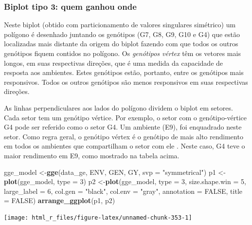 \documentclass[
]{book}
\newenvironment{Shaded}{\begin{snugshade}}{\end{snugshade}}
\newcommand{\DataTypeTok}[1]{\textcolor[rgb]{0.13,0.29,0.53}{#1}}
\newcommand{\DecValTok}[1]{\textcolor[rgb]{0.00,0.00,0.81}{#1}}
\newcommand{\KeywordTok}[1]{\textcolor[rgb]{0.13,0.29,0.53}{\textbf{#1}}}
\newcommand{\NormalTok}[1]{#1}
\newcommand{\OtherTok}[1]{\textcolor[rgb]{0.56,0.35,0.01}{#1}}
\newcommand{\StringTok}[1]{\textcolor[rgb]{0.31,0.60,0.02}{#1}}
\begin{document}
\hypertarget{biplot-tipo-3-quem-ganhou-onde}{%
\subsubsection{Biplot tipo 3: quem ganhou onde}\label{biplot-tipo-3-quem-ganhou-onde}}

Neste biplot (obtido com particionamento de valores singulares simétrico) um polígono é desenhado juntando os genótipos (G7, G8, G9, G10 e G4) que estão localizadas mais distante da origem do biplot fazendo com que todos os outros genótipos fiquem contidos no polígono. Os \emph{genótipos vértex} têm os vetores mais longos, em suas respectivas direções, que é uma medida da capacidade de resposta aos ambientes. Estes genótipos estão, portanto, entre os genótipos mais responsivos. Todos os outros genótipos são menos responsivos em suas respectivas direções.

As linhas perpendiculares aos lados do polígono dividem o biplot em setores. Cada setor tem um genótipo vértice. Por exemplo, o setor com o genótipo-vértice G4 pode ser referido como o setor G4. Um ambiente (E9), foi enquadrado neste setor. Como regra geral, o genótipo vértex é o genótipo de mais alto rendimento em todos os ambientes que compartilham o setor com ele \citep{Yan2007}. Neste caso, G4 teve o maior rendimento em E9, como mostrado na tabela acima.

\begin{Shaded}
\begin{Highlighting}[]
\NormalTok{gge_model <-}\KeywordTok{gge}\NormalTok{(data_ge, ENV, GEN, GY, }\DataTypeTok{svp =} \StringTok{"symmetrical"}\NormalTok{)}
\NormalTok{p1 <-}\KeywordTok{plot}\NormalTok{(gge_model, }\DataTypeTok{type =} \DecValTok{3}\NormalTok{)}
\NormalTok{p2 <-}\KeywordTok{plot}\NormalTok{(gge_model,}
          \DataTypeTok{type =} \DecValTok{3}\NormalTok{,}
          \DataTypeTok{size.shape.win =} \DecValTok{5}\NormalTok{,}
          \DataTypeTok{large_label =} \DecValTok{6}\NormalTok{,}
          \DataTypeTok{col.gen =} \StringTok{"black"}\NormalTok{,}
          \DataTypeTok{col.env =} \StringTok{"gray"}\NormalTok{,}
          \DataTypeTok{annotation =} \OtherTok{FALSE}\NormalTok{,}
          \DataTypeTok{title =} \OtherTok{FALSE}\NormalTok{)}
\KeywordTok{arrange_ggplot}\NormalTok{(p1, p2)}
\end{Highlighting}
\end{Shaded}

\begin{center}\texttt{[image: html\_r\_files/figure-latex/unnamed-chunk-353-1]} \end{center}
\end{document}
